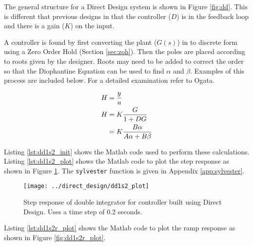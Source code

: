 \documentclass{article}
\newcommand{\sincludepdf}[2][]{
	
}
\begin{document}
The general structure for a Direct Design system is shown in
Figure \ref{fig:dd}.
This is different that previous designs in that the controller ($D$)
is in the feedback loop and there is a gain ($K$) on the input.

A controller is found by first converting the plant ($G(s)$) in to discrete
form using a Zero Order Hold (Section \ref{sec:zoh}).
Then the poles are placed according to roots given by the designer.
Roots may need to be added to correct the order so that the Diophantine
Equation can be used to find $\alpha$ and $\beta$.
Examples of this process are included below.
For a detailed examination refer to Ogata\autocite[Pg. 517]{ogata1995discrete}.

\begin{align}
	H &= \frac{y}{u} \notag \\
	H &= K \frac{G}{1 + D G} \\
	  &= K \frac{B \alpha}{A \alpha + B \beta}
\end{align}

\sincludepdf[pages=1,
			pagecommand=\subsection*{Example 1}
	]{scan/11211302.pdf}
\sincludepdf[pages=2-5]{scan/11211302.pdf}

Listing \ref{lst:dd1s2_init} shows the Matlab code used to perform
these calculations.
Listing \ref{lst:dd1s2_plot} shows the Matlab code to plot the step response
as shown in Figure \ref{fig:dd1s2_plot}.
The \verb+sylvester+ function is given in Appendix \ref{app:sylvester}.



\clearpage


\begin{figure}
\begin{center}
\texttt{[image: ../direct\_design/dd1s2\_plot]}
\end{center}
\caption{Step response of double integrator for controller built
using Direct Design. Uses a time step of 0.2 seconds.}
\label{fig:dd1s2_plot}
\end{figure}

\clearpage
Listing \ref{lst:dd1s2r_plot} shows the Matlab code to plot the ramp response
as shown in Figure \ref{fig:dd1s2r_plot}.
\end{document}
